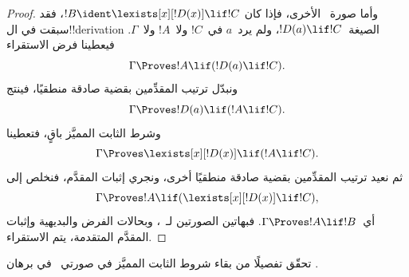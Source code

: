 \documentclass[../../../include/open-logic-section]{subfiles}
\begin{document}
\begin{proof}
وأما صورة~\QR{} الأخرى، فإذا كان
$!B \ident \lexists[x][!D(x)] \lif !C$، فقد سبقت في ال!!{derivation}
الصيغة~$!D(a) \lif !C$، ولم يرد~$a$ في~$!C$ ولا~$!A$ ولا~$\Gamma$.
فيعطينا فرض الاستقراء
\[
  \Gamma \Proves !A \lif (!D(a) \lif !C).
\]
ونبدّل ترتيب المقدِّمين بقضية صادقة منطقيًا، فينتج
\[
  \Gamma \Proves !D(a) \lif (!A \lif !C).
\]
وشرط الثابت المميَّز باقٍ، فتعطينا~\QR{}
\[
  \Gamma \Proves \lexists[x][!D(x)] \lif (!A \lif !C).
\]
ثم نعيد ترتيب المقدِّمين بقضية صادقة منطقيًا أخرى، ونجري إثبات المقدَّم،
فنخلص إلى
\[
  \Gamma \Proves !A \lif (\lexists[x][!D(x)] \lif !C),
\]
أي~$\Gamma \Proves !A \lif !B$. فبهاتين الصورتين لـ~\QR{}، وبحالات
الفرض والبديهية وإثبات المقدَّم المتقدمة، يتم الاستقراء.
\end{proof}

\begin{prob}
  تحقّق تفصيلًا من بقاء شروط الثابت المميَّز في صورتي~\QR{} في برهان
  .
\end{prob}
\end{document}
